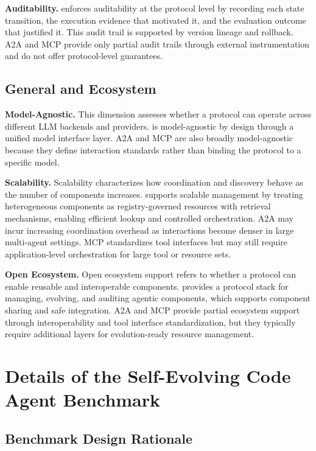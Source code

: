 \textbf{Auditability.} \projectname enforces auditability at the protocol level by recording each state transition, the execution evidence that motivated it, and the evaluation outcome that justified it. This audit trail is supported by version lineage and rollback. A2A and MCP provide only partial audit trails through external instrumentation and do not offer protocol-level guarantees.

\subsection{General and Ecosystem}

\textbf{Model-Agnostic.} This dimension assesses whether a protocol can operate across different LLM backends and providers. \projectname is model-agnostic by design through a unified model interface layer. A2A and MCP are also broadly model-agnostic because they define interaction standards rather than binding the protocol to a specific model.

\textbf{Scalability.} Scalability characterizes how coordination and discovery behave as the number of components increases. \projectname supports scalable management by treating heterogeneous components as registry-governed resources with retrieval mechanisms, enabling efficient lookup and controlled orchestration. A2A may incur increasing coordination overhead as interactions become denser in large multi-agent settings. MCP standardizes tool interfaces but may still require application-level orchestration for large tool or resource sets.

\textbf{Open Ecosystem.} Open ecosystem support refers to whether a protocol can enable reusable and interoperable components. \projectname provides a protocol stack for managing, evolving, and auditing agentic components, which supports component sharing and safe integration. A2A and MCP provide partial ecosystem support through interoperability and tool interface standardization, but they typically require additional layers for evolution-ready resource management.

\section{Details of the Self-Evolving Code Agent Benchmark}
\label{app:coding-benchmark}

\subsection{Benchmark Design Rationale}

